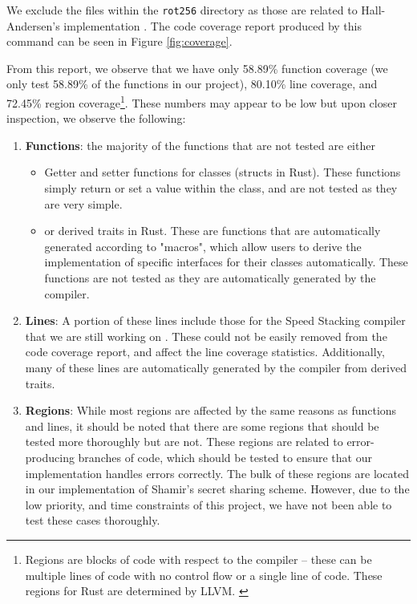 We exclude the files within the \texttt{rot256} directory as those are related to Hall-Andersen's implementation \cite{MHAStackSig}. The code coverage report produced by this command can be seen in Figure \ref{fig:coverage}. 

From this report, we observe that we have only 58.89\% function 
coverage (we only test 58.89\% of the functions in our project), 80.10\% line 
coverage, and 72.45\% region coverage\footnote{Regions are blocks of code with 
respect to the compiler -- these can be multiple lines of code with no control flow 
or a single line of code. These regions for Rust are determined by LLVM. \cite{llvm-cov-explain}}. These numbers may appear to be low but upon closer inspection,
we observe the following:
\begin{enumerate}
  \item \textbf{Functions}: the majority of the functions that are not tested are either
  \begin{itemize}
    \item Getter and setter functions for classes (structs in Rust). These functions 
    simply return or set a value within the class, and are not tested as they are very simple. 
    \item or derived traits \cite{rust-book-derived-traits} in Rust. These are functions that are automatically generated according to "macros", which allow users to derive the implementation of specific interfaces for their classes automatically. These functions are not tested as they are automatically generated by the compiler. 
  \end{itemize}
  \item \textbf{Lines}: A portion of these lines include those for the Speed Stacking 
  compiler that we are still working on \cite{SpeedStacking}. These could not be 
  easily removed from the code coverage report, and affect the line coverage statistics.
  Additionally, many of these lines are automatically generated by the compiler from 
  derived traits. 
  \item \textbf{Regions}: While most regions are affected by the same reasons as functions and lines, it should be noted that there are some regions that should be 
  tested more thoroughly but are not. These regions are related to error-producing 
  branches of code, which should be tested to ensure that our implementation handles 
  errors correctly. The bulk of these regions are located in our implementation of 
  Shamir's secret sharing scheme. However, due to the low priority, and time constraints 
  of this project, we have not been able to test these cases thoroughly.
\end{enumerate}

